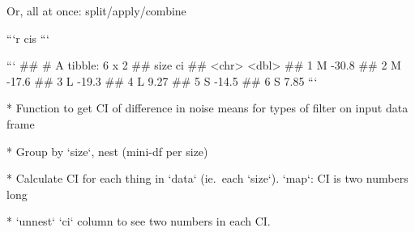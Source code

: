 \documentclass[ignorenonframetext,]{beamer}
\newenvironment{Shaded}{\begin{snugshade}}{\end{snugshade}}
\newcommand{\ControlFlowTok}[1]{\textcolor[rgb]{0.13,0.29,0.53}{\textbf{#1}}}
\newcommand{\DataTypeTok}[1]{\textcolor[rgb]{0.13,0.29,0.53}{#1}}
\newcommand{\KeywordTok}[1]{\textcolor[rgb]{0.13,0.29,0.53}{\textbf{#1}}}
\newcommand{\NormalTok}[1]{#1}
\newcommand{\OperatorTok}[1]{\textcolor[rgb]{0.81,0.36,0.00}{\textbf{#1}}}
\newcommand{\StringTok}[1]{\textcolor[rgb]{0.31,0.60,0.02}{#1}}
\begin{document}
\begin{frame}[fragile]{Or, all at once: split/apply/combine}
\protect\hypertarget{or-all-at-once-splitapplycombine}{}

\begin{Shaded}
\end{Shaded}

\begin{multicols}{2}

```r
cis
```

```
## # A tibble: 6 x 2
##   size      ci
##   <chr>  <dbl>
## 1 M     -30.8 
## 2 M     -17.6 
## 3 L     -19.3 
## 4 L       9.27
## 5 S     -14.5 
## 6 S       7.85
```



\begin{small}


* Function to get CI of difference in noise means for types
of filter on input data frame

* Group by `size`, nest (mini-df per size)

* Calculate CI for each thing in `data` (ie.\ each
`size`). `map`: CI is two numbers long

* `unnest` `ci` column to see two numbers
in each CI.

\end{small}
\end{multicols}

\end{frame}
\end{document}
